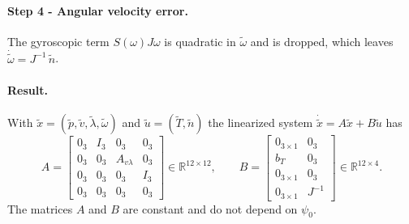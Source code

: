 \paragraph{Step 4 - Angular velocity error.}
The gyroscopic term $S(\omega) J \omega$ is quadratic in $\tilde\omega$ and is dropped, which leaves $\dot{\tilde\omega} = J^{-1}\,\tilde n$.

\paragraph{Result.}
With $\tilde x = (\tilde p, \tilde v, \tilde\lambda, \tilde\omega)$ and $\tilde u = (\tilde T, \tilde n)$ the linearized system $\dot{\tilde x} = A\tilde x + B\tilde u$ has
\begin{equation*}
A = \begin{bmatrix}
0_3 & I_3 & 0_3 & 0_3 \\
0_3 & 0_3 & A_{v\lambda} & 0_3 \\
0_3 & 0_3 & 0_3 & I_3 \\
0_3 & 0_3 & 0_3 & 0_3
\end{bmatrix} \in \mathbb{R}^{12\times 12}, \qquad
B = \begin{bmatrix}
0_{3\times 1} & 0_3 \\
b_T & 0_3 \\
0_{3\times 1} & 0_3 \\
0_{3\times 1} & J^{-1}
\end{bmatrix} \in \mathbb{R}^{12\times 4}.
\end{equation*}
The matrices $A$ and $B$ are constant and do not depend on $\psi_0$.
